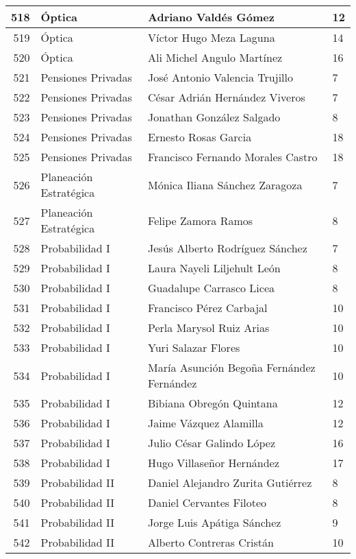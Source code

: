 \begin{table}[ht]
\begin{tabular}{rlll}
  518 & Óptica & Adriano Valdés Gómez & 12 \\ \hline
  519 & Óptica & Víctor Hugo Meza Laguna & 14 \\ \hline
  520 & Óptica & Ali Michel Angulo Martínez & 16 \\ \hline
  521 & Pensiones Privadas & José Antonio Valencia Trujillo & 7 \\ \hline
  522 & Pensiones Privadas & César Adrián Hernández Viveros & 7 \\ \hline
  523 & Pensiones Privadas & Jonathan González Salgado & 8 \\ \hline
  524 & Pensiones Privadas & Ernesto Rosas Garcia & 18 \\ \hline
  525 & Pensiones Privadas & Francisco Fernando Morales Castro & 18 \\ \hline
  526 & Planeación Estratégica & Mónica Iliana Sánchez Zaragoza & 7 \\ \hline
  527 & Planeación Estratégica & Felipe Zamora Ramos & 8 \\ \hline
  528 & Probabilidad I & Jesús Alberto Rodríguez Sánchez & 7 \\ \hline
  529 & Probabilidad I & Laura Nayeli Liljehult León & 8 \\ \hline
  530 & Probabilidad I & Guadalupe Carrasco Licea & 8 \\ \hline
  531 & Probabilidad I & Francisco Pérez Carbajal & 10 \\ \hline
  532 & Probabilidad I & Perla Marysol Ruiz Arias & 10 \\ \hline
  533 & Probabilidad I & Yuri Salazar Flores & 10 \\ \hline
  534 & Probabilidad I & María Asunción Begoña Fernández Fernández & 10 \\ \hline
  535 & Probabilidad I & Bibiana Obregón Quintana & 12 \\ \hline
  536 & Probabilidad I & Jaime Vázquez Alamilla & 12 \\ \hline
  537 & Probabilidad I & Julio César Galindo López & 16 \\ \hline
  538 & Probabilidad I & Hugo Villaseñor Hernández & 17 \\ \hline
  539 & Probabilidad II & Daniel Alejandro Zurita Gutiérrez & 8 \\ \hline
  540 & Probabilidad II & Daniel Cervantes Filoteo & 8 \\ \hline
  541 & Probabilidad II & Jorge Luis Apátiga Sánchez & 9 \\ \hline
  542 & Probabilidad II & Alberto Contreras Cristán & 10 \\ \hline

\end{tabular}
\end{table}

